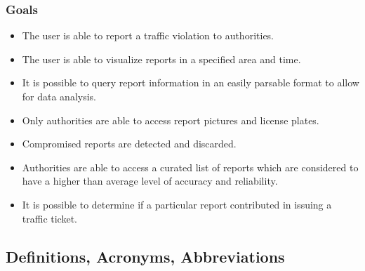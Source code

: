 \subsubsection{Goals}
\begin{itemize}[label={}]
\item
\begin{goal}
    The user is able to report a traffic violation to authorities.
\end{goal}
\item
\begin{goal}
    The user is able to visualize reports in a specified area and time.
\end{goal}
\item
\begin{goal}
    It is possible to query report information in an easily parsable format to allow for data analysis.
\end{goal}
\item
\begin{goal}
    Only authorities are able to access report pictures and license plates.
\end{goal}
\item
\begin{goal}
    Compromised reports are detected and discarded.
\end{goal}
\item
\begin{goal}
    Authorities are able to access a curated list of reports which are considered to have a higher than average level of accuracy and reliability.
\end{goal}
\item
\begin{goal}
    It is possible to determine if a particular report contributed in issuing a traffic ticket.
\end{goal}
\end{itemize}

\subsection{Definitions, Acronyms, Abbreviations}
